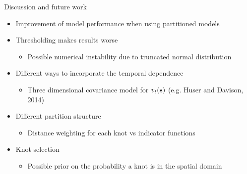 \documentclass{beamer}
\begin{document}


\begin{frame}{Discussion and future work}
  \begin{itemize} \setlength{\itemsep}{0.5em}
    \item Improvement of model performance when using partitioned models
    \item Thresholding makes results worse
    \begin{itemize}
      \item Possible numerical instability due to truncated normal distribution
    \end{itemize}
    \item Different ways to incorporate the temporal dependence
    \begin{itemize}
    	\item Three dimensional covariance model for $v_t(\mbox{\bf s})$ (e.g. Huser and Davison, 2014)
    \end{itemize}
    \item Different partition structure
    \begin{itemize}
      \item Distance weighting for each knot vs indicator functions
    \end{itemize}
    \item Knot selection
    \begin{itemize}
      \item Possible prior on the probability a knot is in the spatial domain
    \end{itemize}
  \end{itemize}
\end{frame}
\end{document}

